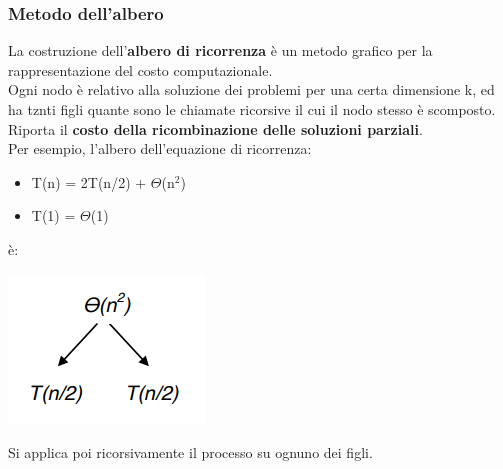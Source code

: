 \documentclass{report}
\newcommand{\T}[1]{$\Theta$(#1)}
\begin{document}
            \subsubsection{Metodo dell'albero}
                La costruzione dell'\textbf{albero di ricorrenza} è un metodo 
                grafico per la rappresentazione del costo computazionale. \\
                Ogni nodo è relativo alla soluzione dei problemi per una certa dimensione
                k, ed ha tznti figli quante sono le chiamate ricorsive il cui il nodo stesso 
                è scomposto. \\
                Riporta il \textbf{costo della ricombinazione delle soluzioni parziali}. \\
                Per esempio, l'albero dell'equazione di ricorrenza:
                \begin{itemize}
                    \item T(n) = 2T(n/2) + \T{n$^2$}
                    \item T(1) = \T{1}
                \end{itemize}
                è:
                \begin{center}
                    \includegraphics{albero.png}
                \end{center}
                Si applica poi ricorsivamente il processo su ognuno dei figli.
\end{document}
